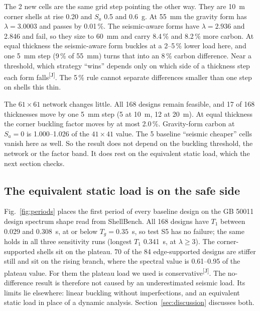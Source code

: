 \documentclass[preprint,12pt]{elsarticle}
\newcommand{\jud}{\textsuperscript{\textcolor{markcol}{\sffamily\scriptsize[J]}}}
\newcommand{\jud}{}
\begin{document}
\begin{table}
\centering
\caption{Pre-registered comparison under the baseline and the three sensitivity runs. A difference below 5\,\% is no meaningful difference. ``$t$ changed'': designs whose thickness differs from the baseline. Headline scope: rise 0.15, both supports, $S_a \geq 0.2$~g (10 cells per span).}
\label{tab:verdicts}

\end{table}

The 2 new cells are the same grid step pointing the other way. They are 10~m corner shells at rise 0.20 and $S_a$ 0.5 and 0.6~g. At 55~mm the gravity form has $\lambda = 3.0003$ and passes by 0.01\,\%. The seismic-aware forms have $\lambda = 2.936$ and 2.846 and fail, so they size to 60~mm and carry 8.4\,\% and 8.2\,\% more carbon. At equal thickness the seismic-aware form buckles at a 2--5\,\% lower load here, and one 5~mm step (9\,\% of 55~mm) turns that into an 8\,\% carbon difference. Near a threshold, which strategy ``wins'' depends only on which side of a thickness step each form falls\jud. The 5\,\% rule cannot separate differences smaller than one step on shells this thin.

The $61 \times 61$ network changes little. All 168 designs remain feasible, and 17 of 168 thicknesses move by one 5~mm step (5 at 10~m, 12 at 20~m). At equal thickness the corner buckling factor moves by at most 2.0\,\%. Gravity-form carbon at $S_a = 0$ is 1.000--1.026 of the $41 \times 41$ value. The 5 baseline ``seismic cheaper'' cells vanish here as well. So the result does not depend on the buckling threshold, the network or the factor band. It does rest on the equivalent static load, which the next section checks.

\subsection{The equivalent static load is on the safe side}

Fig.~\ref{fig:periods} places the first period of every baseline design on the GB 50011 design spectrum shape read from ShellBench. All 168 designs have $T_1$ between 0.029 and 0.308~s, at or below $T_g = 0.35$~s, so test S5 has no failure; the same holds in all three sensitivity runs (longest $T_1$ 0.341~s, at $\lambda \geq 3$). The corner-supported shells sit on the plateau. 70 of the 84 edge-supported designs are stiffer still and sit on the rising branch, where the spectral value is 0.61--0.95 of the plateau value. For them the plateau load we used is conservative\jud. The no-difference result is therefore not caused by an underestimated seismic load. Its limits lie elsewhere: linear buckling without imperfections, and an equivalent static load in place of a dynamic analysis. Section~\ref{sec:discussion} discusses both.
\end{document}

